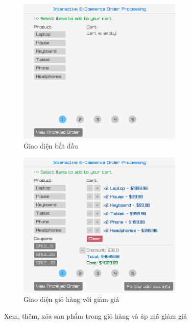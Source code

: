 \documentclass[a4paper,12pt]{report}
\begin{document}
\begin{figure}[!ht]
  \centering
  \begin{subfigure}{0.46\textwidth}
    \centering
    \includegraphics[width=0.9\textwidth]{../assets/screenshots/gui/cart_empty.png}
    \caption{Giao diện bắt đầu}
  \end{subfigure}
  \hfill
  \begin{subfigure}{0.46\textwidth}
    \centering
    \includegraphics[width=0.9\textwidth]{../assets/screenshots/gui/cart_with_discount.png}
    \caption{Giao diện giỏ hàng với giảm giá}
  \end{subfigure}
  \caption{Xem, thêm, xóa sản phẩm trong giỏ hàng và áp mã giảm giá}
\end{figure}
\end{document}
